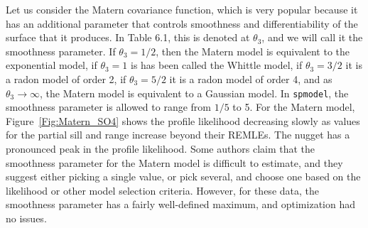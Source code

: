 \documentclass[12pt, titlepage]{article}
\begin{document}
Let us consider the Matern covariance function, which is very popular because it has an additional parameter that controls smoothness and differentiability of the surface that it produces.  In Table 6.1, this is denoted at $\theta_{3}$, and we will call it the smoothness parameter. If $\theta_{3} = 1/2$, then the Matern model is equivalent to the exponential model, if $\theta_{3} = 1$ is has been called the Whittle model, if $\theta_{3} = 3/2$ it is a radon model of order 2, if $\theta_{3} = 5/2$ it is a radon model of order 4, and as $\theta_{3} \rightarrow \infty$, the Matern model is equivalent to a Gaussian model.  In \texttt{spmodel}, the smoothness parameter is allowed to range from $1/5$ to 5.  For the Matern model, Figure~\ref{Fig:Matern_SO4}  shows the profile likelihood decreasing slowly as values for the partial sill and range increase beyond their REMLEs.  The nugget has a pronounced peak in the profile likelihood.  Some authors claim that the smoothness parameter for the Matern model is difficult to estimate, and they suggest either picking a single value, or pick several, and choose one based on the likelihood or other model selection criteria.  However, for these data, the smoothness parameter has a fairly well-defined maximum, and optimization had no issues.



%


%
%
\end{document}
